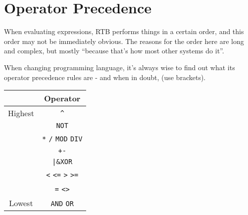 \chapter{Operator Precedence}

When evaluating expressions, RTB performs things in a certain order,
and this order may not be immediately obvious. The reasons for the order
here are long and complex, but mostly ``because that's how most other
systems do it''.

When changing programming language, it's always wise to find out what its
operator precedence rules are - and when in doubt, (use brackets).

\begin{center}
\begin{tabular}[t]{|c|c|}
\hline
& Operator\\
\hline
Highest	&\texttt{\^}\\
\hline
&\texttt{NOT}\\
\hline
&\texttt{*}\hspace{3mm}
\texttt{/}\hspace{3mm}
\texttt{MOD}
\hspace{3mm}
\texttt{DIV}\\
\hline
&\texttt{+}\hspace{3mm}\texttt{-}\\
\hline
&\texttt{|}\hspace{3mm}\texttt{\&}\hspace{3mm}\texttt{XOR}\\
\hline
&\texttt{<}\hspace{3mm}
\texttt{<=}\hspace{3mm}
\texttt{>}\hspace{3mm}
\texttt{>=}\\
\hline
&\texttt{=}\hspace{3mm}
\texttt{<>}\\
\hline
Lowest &\texttt{AND}\hspace{3mm}
\texttt{OR}\\
\hline
\end{tabular}
\end{center}
